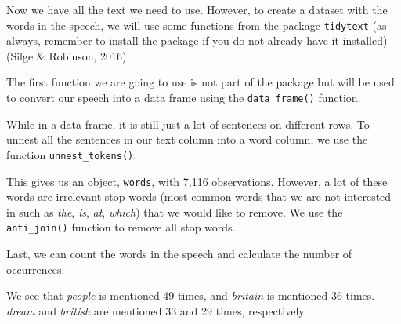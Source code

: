 \documentclass[12pt,oneside]{reedthesis}
\theoremstyle{definition}
\theoremstyle{definition}
\theoremstyle{definition}
\theoremstyle{remark}
\begin{document}
  Now we have all the text we need to use. However, to create a dataset
  with the words in the speech, we will use some functions from the
  package \texttt{tidytext} (as always, remember to install the package if
  you do not already have it installed) (Silge \& Robinson, 2016).
  \begin{Shaded}
  \begin{Highlighting}[]
  \NormalTok{(}\NormalTok{)}
  \end{Highlighting}
  \end{Shaded}
  The first function we are going to use is not part of the package but
  will be used to convert our speech into a data frame using the
  \texttt{data\_frame()} function.
  \begin{Shaded}
  \begin{Highlighting}[]
  \StringTok{ }\NormalTok{(}
  \end{Highlighting}
  \end{Shaded}
  While in a data frame, it is still just a lot of sentences on different
  rows. To unnest all the sentences in our text column into a word column,
  we use the function \texttt{unnest\_tokens()}.
  \begin{Shaded}
  \end{Shaded}
  This gives us an object, \texttt{words}, with 7,116 observations.
  However, a lot of these words are irrelevant stop words (most common
  words that we are not interested in such as \emph{the}, \emph{is},
  \emph{at}, \emph{which}) that we would like to remove. We use the
  \texttt{anti\_join()} function to remove all stop words.
  \begin{Shaded}
  \end{Shaded}
  Last, we can count the words in the speech and calculate the number of
  occurrences.
  \begin{Shaded}
  \end{Shaded}
  We see that \emph{people} is mentioned 49 times, and \emph{britain} is
  mentioned 36 times. \emph{dream} and \emph{british} are mentioned 33 and
  29 times, respectively.
  
\end{document}
